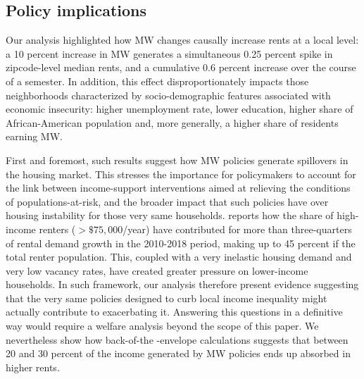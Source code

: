 \subsection{Policy implications}\label{sec:policy}

Our analysis highlighted how MW changes causally increase rents at a local level: a 10 percent
increase in MW generates a simultaneous 0.25 percent spike in zipcode-level median rents, and 
a cumulative 0.6 percent increase over the course of a semester. In addition, this effect 
disproportionately impacts those neighborhoods characterized by socio-demographic
features associated with economic insecurity: higher unemployment rate, lower education, 
higher share of African-American population and, more generally, a higher share of residents 
earning MW. 

First and foremost, such results suggest how MW policies generate spillovers in the housing market. 
This stresses the importance for policymakers to account for the link between 
income-support interventions aimed at relieving the conditions of populations-at-risk, 
and the broader impact that such policies have over housing instability for those very same households.
\textcite{fernald2020americas} reports how the share of high-income renters ($>\$75,000$/year) have contributed for more
than three-quarters of rental demand growth in the 2010-2018 period, making up to 45 percent 
if the total renter population. This, coupled with a very inelastic housing demand and very low 
vacancy rates, have created greater pressure on lower-income households. In such framework, our analysis 
therefore present evidence suggesting that the very same policies designed to curb local income inequality
might actually contribute to exacerbating it. Answering this questions in a definitive way 
would require a welfare analysis beyond the scope of this paper. We nevertheless show how back-of-the
-envelope calculations suggests that between 20 and 30 percent of the income generated by MW policies 
ends up absorbed in higher rents.

